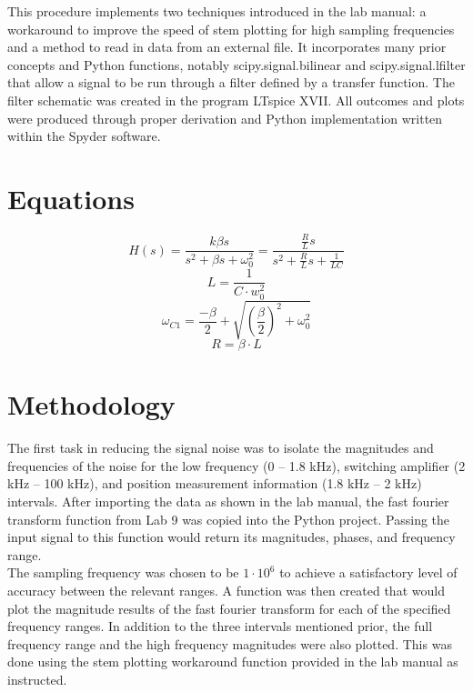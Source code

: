 \documentclass[12pt]{report}
\begin{document}
This procedure implements two techniques introduced in the lab manual: a workaround to improve the speed of stem plotting for high sampling frequencies and a method to read in data from an external file. It incorporates many prior concepts and Python functions, notably scipy.signal.bilinear and scipy.signal.lfilter that allow a signal to be run through a filter defined by a transfer function. The filter schematic was created in the program LTspice XVII. All outcomes and plots were produced through proper derivation and Python implementation written within the Spyder software. \\
		  
\section{Equations}

\begin{equation}
	H(s) = \frac{k\beta s}{s^2+\beta s+\omega_0^2} = \frac{\frac{R}{L}s}{s^2+\frac{R}{L}s+\frac{1}{LC}}
\end{equation}
\begin{equation}
	L = \frac{1}{C\cdot w_0^2}
\end{equation}
\begin{equation}
	\omega_{C1}=\frac{-\beta}{2}+\sqrt{(\frac{\beta}{2})^2+\omega_0^2}
\end{equation}
\begin{equation}
	R = \beta\cdot L
\end{equation}
	
\section{Methodology}

The first task in reducing the signal noise was to isolate the magnitudes and frequencies of the noise for the low frequency (0 -- 1.8 kHz), switching amplifier (2 kHz -- 100 kHz), and position measurement information (1.8 kHz -- 2 kHz) intervals. After importing the data as shown in the lab manual, the fast fourier transform function from Lab 9 was copied into the Python project. Passing the input signal to this function would return its magnitudes, phases, and frequency range. \\

The sampling frequency was chosen to be $ 1\cdot 10^6 $ to achieve a satisfactory level of accuracy between the relevant ranges. A function was then created that would plot the magnitude results of the fast fourier transform for each of the specified frequency ranges. In addition to the three intervals mentioned prior, the full frequency range and the high frequency magnitudes were also plotted. This was done using the stem plotting workaround function provided in the lab manual as instructed.  \\
\end{document}
